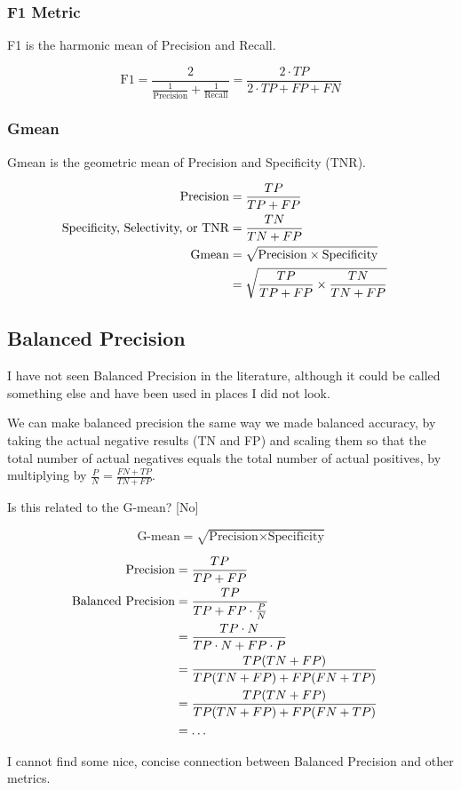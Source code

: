 \subsubsection{F1 Metric}

F1 is the harmonic mean of Precision and Recall.  

$$\text{F1} = \frac{2}{\frac{1}{\text{Precision}} + \frac{1}{\text{Recall}}} 
	= \frac{2 \cdot TP}{2\cdot TP + FP + FN}$$

\subsubsection{Gmean}

Gmean is the geometric mean of Precision and Specificity (TNR).

\begin{align*}
	\text{Precision} & = \frac{TP}{TP + FP}\cr
	\text{Specificity, Selectivity, or TNR} &= \frac{TN}{TN + FP} \cr
	\text{Gmean} &= \sqrt{ \text{Precision} \times \text{Specificity}} \cr
	&= \sqrt{
		\frac{TP}{TP+FP} \times \frac{TN}{TN+FP}
		}
\end{align*}

\subsection{Balanced Precision}

I have not seen Balanced Precision in the literature, although it could be called something else and have been used in places I did not look.  

We can make balanced precision the same way we made balanced accuracy, by taking the actual negative results (TN and FP) and scaling them  so that the total number of actual negatives equals the total number of actual positives, by multiplying by $\frac{P}{N} = \frac{FN+TP}{TN+FP}$.

Is this related to the G-mean?  [No]

$$\text{G-mean} = \sqrt{\text{Precision} \times \text{Specificity}}$$

\begin{align*}
	\text{Precision} &= \frac{TP}{TP+FP} \cr
	\text{Balanced Precision} &= \frac{TP}{TP+FP \cdot \frac{P}{N}} \cr
		&= \frac{TP \cdot N}{TP \cdot N + FP \cdot P} \cr
		&= \frac{TP (TN+FP)}{TP(TN+FP) + FP (FN+TP)} \cr
		&= \frac{TP (TN+FP)}{TP(TN+FP) + FP (FN+TP)} \cr
		&= \dots \cr
\end{align*}

I cannot find some nice, concise connection between Balanced Precision and other metrics.  






